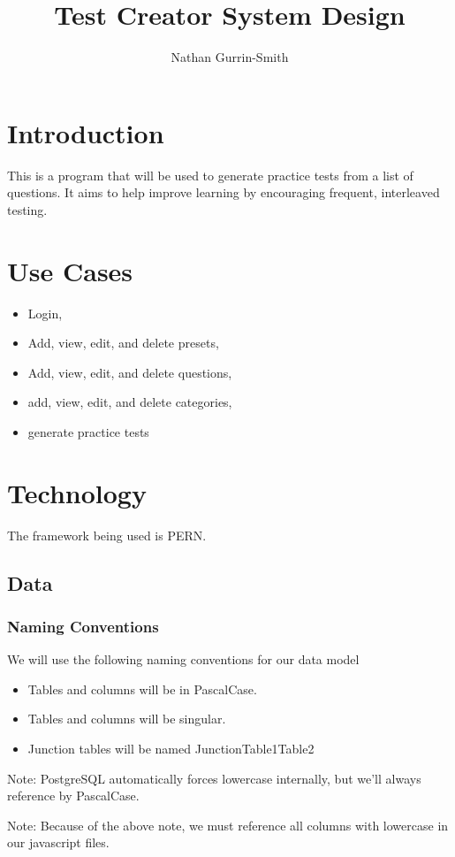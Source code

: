 \documentclass{article}
\title{Test Creator System Design}
\author{Nathan Gurrin-Smith}
\begin{document}
\maketitle

\section{Introduction}
This is a program that will be used to generate practice tests from a list of questions. It aims to help improve learning by encouraging frequent, interleaved testing.

\section{Use Cases}
\begin{itemize}
    \item Login,
    \item Add, view, edit, and delete presets,
    \item Add, view, edit, and delete questions,
    \item add, view, edit, and delete categories,
    \item generate practice tests
\end{itemize}

\newpage
\section{Technology}
The framework being used is PERN.

\subsection{Data}
\subsubsection*{Naming Conventions}
We will use the following naming conventions for our data model
\begin{itemize}
    \item Tables and columns will be in PascalCase.
    \item Tables and columns will be singular.
    \item Junction tables will be named JunctionTable1Table2
\end{itemize}
Note: PostgreSQL automatically forces lowercase internally, but we'll always reference by PascalCase.

Note: Because of the above note, we must reference all columns with lowercase in our javascript files.
\end{document}
